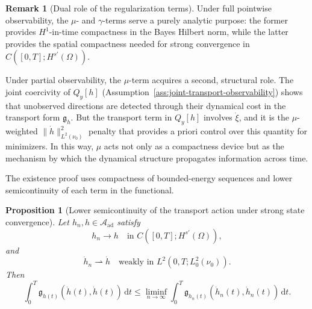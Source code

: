 \documentclass{article}
\newtheorem{proposition}[theorem]{Proposition}
\theoremstyle{definition}
\newtheorem{remark}[theorem]{Remark}
\renewcommand{\d}{\mathrm{d}}
\begin{document}
\begin{remark}[Dual role of the regularization terms]
    \label{rem:dual-role-regularization}
    Under full pointwise observability, the \(\mu\)- and \(\gamma\)-terms serve a purely analytic
    purpose: the former provides \(H^1\)-in-time compactness in the Bayes Hilbert norm, while the
    latter provides the spatial compactness needed for strong convergence in
    \(C([0,T];H^{s'}(\Omega))\).

    Under partial observability, the \(\mu\)-term acquires a second, structural role. The joint
    coercivity of \(Q_y[h]\) (Assumption~\ref{ass:joint-transport-observability}) shows that
    unobserved directions are detected through their dynamical cost in the transport form
    \(\mathfrak g_h\). But the transport term in \(Q_y[h]\) involves \(\dot\xi\), and it is the
    \(\mu\)-weighted \(\|\dot h\|_{L^2(\nu_0)}^2\) penalty that provides a priori control over this
    quantity for minimizers. In this way, \(\mu\) acts not only as a compactness device but as the
    mechanism by which the dynamical structure propagates information across time.
\end{remark}

The existence proof uses compactness of bounded-energy sequences and lower semicontinuity of each
term in the functional.

\begin{proposition}[Lower semicontinuity of the transport action under strong state convergence]
    \label{prop:transport-action-lsc-hsprime}
    Let \(h_n,h\in \mathcal A_{\mathrm{ad}}\) satisfy
    \[
        h_n\to h
        \quad\text{in } C([0,T];H^{s'}(\Omega)),
    \]
    and
    \[
        \dot h_n \rightharpoonup \dot h
        \quad\text{weakly in } L^2(0,T;L^2_0(\nu_0)).
    \]
    Then
    \[
        \int_0^T \mathfrak g_{h(t)}(\dot h(t),\dot h(t))\,\d t
        \le
        \liminf_{n\to\infty}
        \int_0^T \mathfrak g_{h_n(t)}(\dot h_n(t),\dot h_n(t))\,\d t.
    \]
\end{proposition}
\end{document}
